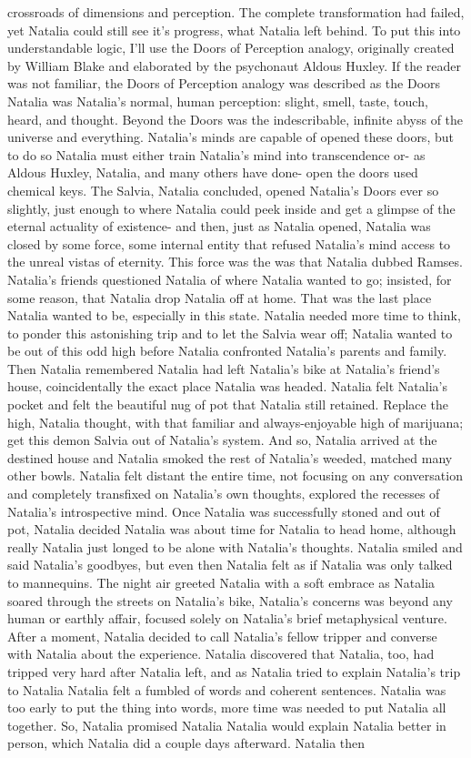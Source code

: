 \documentclass[12pt]{book}
\begin{document}
crossroads of dimensions and perception. The complete transformation had failed, yet Natalia could still see it's progress, what Natalia left behind. To put this into understandable logic, I'll use the Doors of Perception analogy, originally created by William Blake and elaborated by the psychonaut Aldous Huxley. If the reader was not familiar, the Doors of Perception analogy was described as the Doors Natalia was Natalia's normal, human perception: slight, smell, taste, touch, heard, and thought. Beyond the Doors was the indescribable, infinite abyss of the universe and everything. Natalia's minds are capable of opened these doors, but to do so Natalia must either train Natalia's mind into transcendence or- as Aldous Huxley, Natalia, and many others have done- open the doors used chemical keys. The Salvia, Natalia concluded, opened Natalia's Doors ever so slightly, just enough to where Natalia could peek inside and get a glimpse of the eternal actuality of existence- and then, just as Natalia opened, Natalia was closed by some force, some internal entity that refused Natalia's mind access to the unreal vistas of eternity. This force was the was that Natalia dubbed Ramses. Natalia's friends questioned Natalia of where Natalia wanted to go; insisted, for some reason, that Natalia drop Natalia off at home. That was the last place Natalia wanted to be, especially in this state. Natalia needed more time to think, to ponder this astonishing trip and to let the Salvia wear off; Natalia wanted to be out of this odd high before Natalia confronted Natalia's parents and family. Then Natalia remembered Natalia had left Natalia's bike at Natalia's friend's house, coincidentally the exact place Natalia was headed. Natalia felt Natalia's pocket and felt the beautiful nug of pot that Natalia still retained. Replace the high, Natalia thought, with that familiar and always-enjoyable high of marijuana; get this demon Salvia out of Natalia's system. And so, Natalia arrived at the destined house and Natalia smoked the rest of Natalia's weeded, matched many other bowls. Natalia felt distant the entire time, not focusing on any conversation and completely transfixed on Natalia's own thoughts, explored the recesses of Natalia's introspective mind. Once Natalia was successfully stoned and out of pot, Natalia decided Natalia was about time for Natalia to head home, although really Natalia just longed to be alone with Natalia's thoughts. Natalia smiled and said Natalia's goodbyes, but even then Natalia felt as if Natalia was only talked to mannequins. The night air greeted Natalia with a soft embrace as Natalia soared through the streets on Natalia's bike, Natalia's concerns was beyond any human or earthly affair, focused solely on Natalia's brief metaphysical venture. After a moment, Natalia decided to call Natalia's fellow tripper and converse with Natalia about the experience. Natalia discovered that Natalia, too, had tripped very hard after Natalia left, and as Natalia tried to explain Natalia's trip to Natalia Natalia felt a fumbled of words and coherent sentences. Natalia was too early to put the thing into words, more time was needed to put Natalia all together. So, Natalia promised Natalia Natalia would explain Natalia better in person, which Natalia did a couple days afterward. Natalia then 
\end{document}
